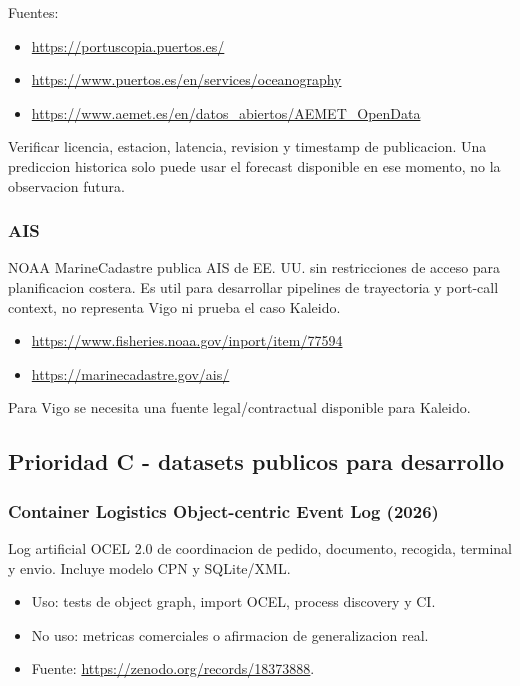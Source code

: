 \documentclass[
  spanish,
  10pt,
  a4paper,
]{article}
\providecommand{\tightlist}{%
  \setlength{\itemsep}{0pt}\setlength{\parskip}{0pt}}
\begin{document}
Fuentes:

\begin{itemize}
\tightlist
\item
  \url{https://portuscopia.puertos.es/}
\item
  \url{https://www.puertos.es/en/services/oceanography}
\item
  \url{https://www.aemet.es/en/datos_abiertos/AEMET_OpenData}
\end{itemize}

Verificar licencia, estacion, latencia, revision y timestamp de
publicacion. Una prediccion historica solo puede usar el forecast
disponible en ese momento, no la observacion futura.

\subsubsection{AIS}\label{ais}

NOAA MarineCadastre publica AIS de EE. UU. sin restricciones de acceso
para planificacion costera. Es util para desarrollar pipelines de
trayectoria y port-call context, no representa Vigo ni prueba el caso
Kaleido.

\begin{itemize}
\tightlist
\item
  \url{https://www.fisheries.noaa.gov/inport/item/77594}
\item
  \url{https://marinecadastre.gov/ais/}
\end{itemize}

Para Vigo se necesita una fuente legal/contractual disponible para
Kaleido.

\subsection{Prioridad C - datasets publicos para
desarrollo}\label{prioridad-c---datasets-publicos-para-desarrollo}

\subsubsection{Container Logistics Object-centric Event Log
(2026)}\label{container-logistics-object-centric-event-log-2026}

Log artificial OCEL 2.0 de coordinacion de pedido, documento, recogida,
terminal y envio. Incluye modelo CPN y SQLite/XML.

\begin{itemize}
\tightlist
\item
  Uso: tests de object graph, import OCEL, process discovery y CI.
\item
  No uso: metricas comerciales o afirmacion de generalizacion real.
\item
  Fuente: \url{https://zenodo.org/records/18373888}.
\end{itemize}
\end{document}
